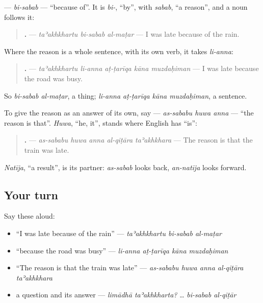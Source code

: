 \begin{grammarlens}[title={Grammar Lens: a thing, or a sentence}]
\textbf{} — \emph{bi-sabab} — \textquotedblleft{}because of\textquotedblright{}. It is \emph{bi-}, \textquotedblleft{}by\textquotedblright{}, with \emph{sabab}, \textquotedblleft{}a reason\textquotedblright{}, and a noun follows it:

\begin{quote}
\textbf{  .} — \emph{taʾakhkhartu bi-sabab al-maṭar} — I was late because of the rain.
\end{quote}

Where the reason is a whole sentence, with its own verb, it takes \emph{li-anna}:

\begin{quote}
\textbf{    .} — \emph{taʾakhkhartu li-anna aṭ-ṭarīqa kāna muzdaḥiman} — I was late because the road was busy.
\end{quote}

So \emph{bi-sabab al-maṭar}, a thing; \emph{li-anna aṭ-ṭarīqa kāna muzdaḥiman}, a sentence.
\end{grammarlens}

\begin{grammarlens}[title={Grammar Lens: the reason is that}]
To give the reason as an answer of its own, say \textbf{  } — \emph{as-sababu huwa anna} — \textquotedblleft{}the reason is that\textquotedblright{}. \emph{Huwa}, \textquotedblleft{}he, it\textquotedblright{}, stands where English has \textquotedblleft{}is\textquotedblright{}:

\begin{quote}
\textbf{    .} — \emph{as-sababu huwa anna al-qiṭāra taʾakhkhara} — The reason is that the train was late.
\end{quote}

\emph{Natīja}, \textquotedblleft{}a result\textquotedblright{}, is its partner: \emph{as-sabab} looks back, \emph{an-natīja} looks forward.
\end{grammarlens}

\subsection*{Your turn}
Say these aloud:

\begin{itemize}
\raggedright
  \item \textquotedblleft{}I was late because of the rain\textquotedblright{} — \emph{taʾakhkhartu bi-sabab al-maṭar}
  \item \textquotedblleft{}because the road was busy\textquotedblright{} — \emph{li-anna aṭ-ṭarīqa kāna muzdaḥiman}
  \item \textquotedblleft{}The reason is that the train was late\textquotedblright{} — \emph{as-sababu huwa anna al-qiṭāra taʾakhkhara}
  \item a question and its answer — \emph{limādhā taʾakhkharta?} … \emph{bi-sabab al-qiṭār}
\end{itemize}

